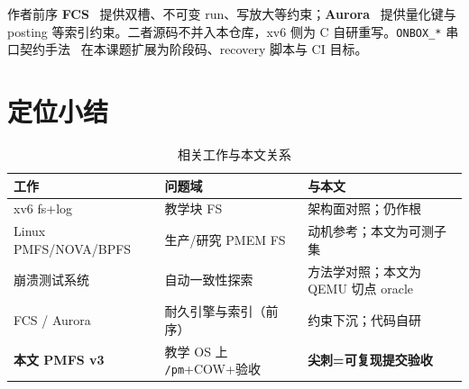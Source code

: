 作者前序 \textbf{FCS}~\cite{fcsown} 提供双槽、不可变 run、写放大等约束；\textbf{Aurora}~\cite{auroraown} 提供量化键与 posting 等索引约束。二者源码不并入本仓库，xv6 侧为 C 自研重写。\texttt{ONBOX\_*} 串口契约手法~\cite{cxcos} 在本课题扩展为阶段码、recovery 脚本与 CI 目标。

\section{定位小结}

\begin{table}[htbp]
  \centering
  \caption{相关工作与本文关系}
  \label{tab:related}
  \begin{tabular}{p{3.0cm}p{4.0cm}p{5.5cm}}
    \toprule
    工作 & 问题域 & 与本文 \\
    \midrule
    xv6 fs+log & 教学块 FS & 架构面对照；仍作根 \\
    Linux PMFS/NOVA/BPFS & 生产/研究 PMEM FS & 动机参考；本文为可测子集 \\
    崩溃测试系统 & 自动一致性探索 & 方法学对照；本文为 QEMU 切点 oracle \\
    FCS / Aurora & 耐久引擎与索引（前序） & 约束下沉；代码自研 \\
    \textbf{本文 PMFS v3} & 教学 OS 上 \texttt{/pm}+COW+验收
      & \textbf{尖刺=可复现提交验收} \\
    \bottomrule
  \end{tabular}
\end{table}
